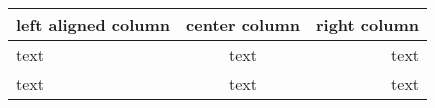 \documentclass[11pt]{article}
\begin{document}
\begin{tabular}{|lcr||}
left aligned column & center column & right column\\
\hline
text & text & text\\
text & text & text\\
\end{tabular}
\end{document}
